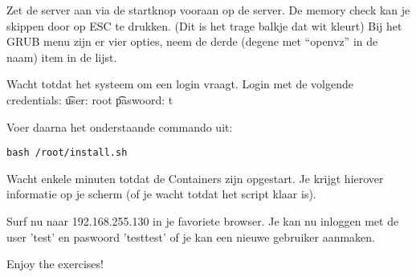Zet de server aan via de startknop vooraan op de server. De memory check kan je skippen door op ESC te drukken. (Dit is het trage balkje dat wit kleurt) Bij het GRUB menu zijn er vier opties, neem de derde (degene met ``openvz'' in de naam) item in de lijst. 

Wacht totdat het systeem om een login vraagt. Login met de volgende credentials: 
\t user: root
\t paswoord: t

Voer daarna het onderstaande commando uit:
\begin{lstlisting}
bash /root/install.sh
\end{lstlisting}

Wacht enkele minuten totdat de Containers zijn opgestart. Je krijgt hierover informatie op je scherm (of je wacht totdat het script klaar is). 

Surf nu naar 192.168.255.130 in je favoriete browser. 
Je kan nu inloggen met de user 'test' en paswoord 'testtest' of je kan een nieuwe gebruiker aanmaken.

Enjoy the exercises!
